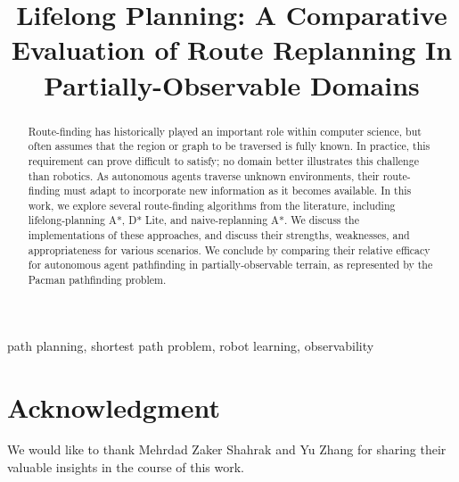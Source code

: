 \documentclass[conference]{IEEEtran}
\begin{document}
\title{Lifelong Planning: A Comparative Evaluation of Route Replanning In Partially-Observable Domains}

\author{
}

\maketitle

\begin{abstract}
Route-finding has historically played an important role within computer science, but often assumes that the region or graph to be traversed is fully known. In practice, this requirement can prove difficult to satisfy; no domain better illustrates this challenge than robotics. As autonomous agents traverse unknown environments, their route-finding must adapt to incorporate new information as it becomes available. In this work, we explore several route-finding algorithms from the literature, including lifelong-planning A*, D* Lite, and naive-replanning A*. We discuss the implementations of these approaches, and discuss their strengths, weaknesses, and appropriateness for various scenarios. We conclude by comparing their relative efficacy for autonomous agent pathfinding in partially-observable terrain, as represented by the Pacman pathfinding problem.
\end{abstract}

\begin{IEEEkeywords}
path planning, shortest path problem, robot learning, observability
\end{IEEEkeywords}














\section*{Acknowledgment}
We would like to thank Mehrdad Zaker Shahrak and Yu Zhang for sharing their valuable insights in the course of this work.



\end{document}
